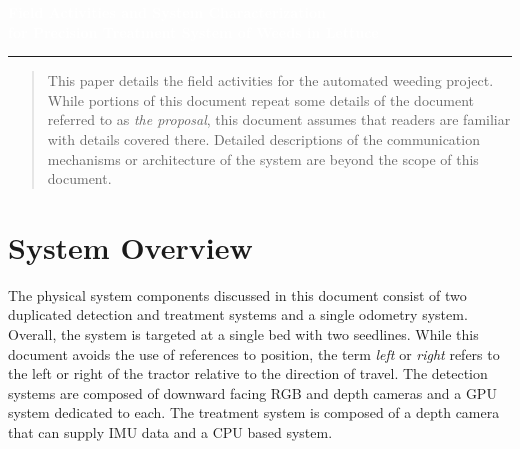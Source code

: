 \documentclass[12pt]{article}
\author{%
\setstretch{1.0}
    Evan McGinnis \\
    PhD Student \\
    Student ID\#  23633780\\
    Biosystems Analytics \\
    \today{} \\
    \texttt{evanmc@arizona.edu}\vspace{40pt} \\
    }
\makeatletter
\def\printauthor{%
    {\large \@author}}
\makeatother
\begin{document}
\begin{titlepage}
\BgThispage
{}
\vspace*{1cm}
\noindent
\textcolor{white}{\Large\textbf{\textsf{Field Activities and System Characterization \\for Precision Treatment System of Weeds in Lettuce}}}
\vspace*{2.5cm}\par
\noindent
\begin{minipage}{0.35\linewidth}
    \begin{flushright}
        \printauthor
    \end{flushright}
\end{minipage} \hspace{15pt}
%
\begin{minipage}{0.02\linewidth}
    \rule{1pt}{175pt}
\end{minipage} \hspace{-10pt}
%
\begin{minipage}{0.6\linewidth}
\vspace{5pt}
    \begin{abstract} 
This paper details the field activities for the automated weeding project. While portions of this document repeat some details of the document referred to as \textit{the proposal}, this document assumes that readers are familiar with details covered there.  Detailed descriptions of the communication mechanisms or architecture of the system are beyond the scope of this document.
    \end{abstract}
\end{minipage}
\end{titlepage}
\restoregeometry
%
%
{
\tableofcontents
\listoftables
\listoffigures
\newpage
}

{
\begin{versionhistory}
\end{versionhistory}
\newpage
}


\section{System Overview}
The physical system components discussed in this document consist of two duplicated detection and treatment systems and a single odometry system. Overall, the system is targeted at a single bed with two seedlines. While this document avoids the use of references to position, the term \textit{left} or \textit{right} refers to the left or right of the tractor relative to the direction of travel. The detection systems are composed of downward facing RGB and depth cameras and a GPU system dedicated to each.  The treatment system is composed of a depth camera that can supply IMU data and a CPU based system.
\end{document}
